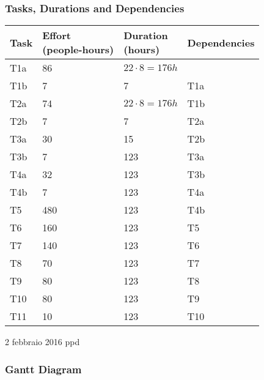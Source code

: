 \subsubsection{Tasks, Durations and Dependencies}
\lipsum[100]
\begin{center}
	\begin{tabulary}{\linewidth\tymin=70pt}{Y{2cm}|Y{3cm}|Y{2cm}|Y{2cm}}
		\textbf{Task} & \textbf{Effort\newline(people-hours)} & \textbf{Duration\newline(hours)} & \textbf{Dependencies} \\ \hline
		T1a &  86 & $22 \cdot 8 = 176h$  & \\ \hline
		T1b & 7 & 7 & T1a \\ \hline
		T2a & 74 & $22 \cdot 8 = 176h$ & T1b \\ \hline
		T2b & 7 & 7 & T2a \\ \hline
		T3a & 30 & 15 & T2b \\ \hline
		T3b & 7 & 123 & T3a \\ \hline
		T4a & 32 & 123 & T3b \\ \hline
		T4b & 7 & 123 & T4a \\ \hline
		T5 & 480 & 123 & T4b \\ \hline
		T6 & 160 & 123 & T5 \\ \hline
		T7 & 140 & 123 & T6 \\ \hline
		T8 & 70 & 123 & T7 \\ \hline
		T9 & 80 & 123 & T8 \\ \hline
		T10 & 80 & 123 & T9 \\ \hline
		T11 & 10 & 123 & T10 \\ \hline
	\end{tabulary}
	
	2 febbraio 2016 ppd
\end{center}
%
\subsubsection{Gantt Diagram}
\lipsum[100]
\begin{center}
	\begin{ganttchart}[hgrid=true, vgrid={*3{white}, dotted}, x unit=1.7mm]{1}{60}
		  \\
		  \\
		 \\
		 \\
		 \\
		 \\
		 \\
	\end{ganttchart}
\end{center}
%